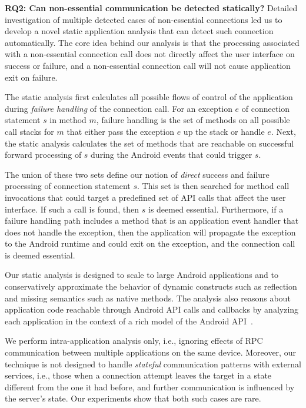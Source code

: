\noindent 
{\bf RQ2: Can non-essential communication be detected statically?}
Detailed investigation of multiple detected cases of non-essential
connections led us to develop a novel static application analysis that
can detect such connection automatically.  The core idea behind our
analysis is that the processing associated with a non-essential
connection call does not directly affect the user interface on success
or failure, and a non-essential connection call will not cause
application exit on failure. 

The static analysis first calculates all possible flows of control of
the application during {\it failure handling} of the connection
call. For an exception $e$ of connection statement $s$ in method $m$,
failure handling is the set of methods on all possible call stacks for
$m$ that either pass the exception $e$ up the stack or handle $e$.
Next, the static analysis calculates the set of methods that are
reachable on successful forward processing of $s$ during the Android
events that could trigger $s$.  

The union of these two sets define our notion of {\it direct} success
and failure processing of connection statement $s$.  This set is then
searched for method call invocations that could target a predefined
set of API calls that affect the user interface.  If such a call is
found, then $s$ is deemed essential.  Furthermore, if a failure
handling path includes a method that is an application event handler
that does not handle the exception, then the application will
propagate the exception to the Android runtime and could exit on the
exception, and the connection call is deemed essential.

Our static analysis is designed to scale to large Android applications
and to conservatively approximate the behavior of dynamic constructs
such as reflection and missing semantics such as native methods.  The
analysis also reasons about application code reachable through Android
API calls and callbacks by analyzing each application in the context
of a rich model of the Android
API~\cite{Gordon:Kim:Perkins:Gilham:Nguyen:Rinard:NDSS15}. 

We perform intra-application analysis only, i.e., ignoring effects of RPC communication between multiple applications on the same device. Moreover, our technique is not designed to handle
\emph{stateful} communication patterns with external services, i.e., those when a connection attempt leaves the target in a state different from the one it had before, and further communication is influenced by the server's state. Our experiments show that both such cases are rare. 

